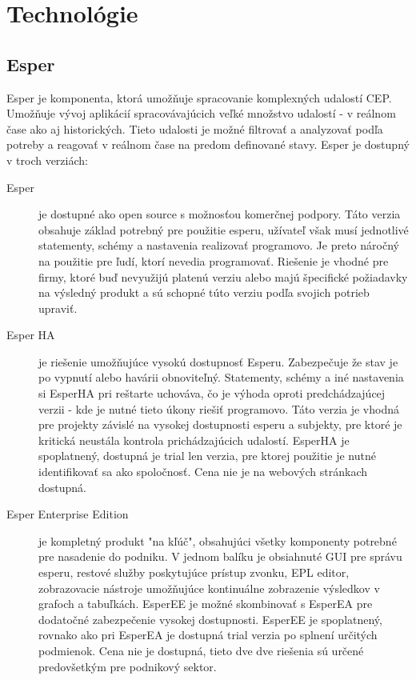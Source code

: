 \chapter{Technológie}
\label{chap:technologie}

\section{Esper}
	Esper je komponenta, ktorá umožňuje spracovanie komplexných udalostí \ac{CEP}. Umožňuje vývoj aplikácií spracovávajúcich veľké množstvo udalostí - v reálnom čase ako aj historických. Tieto udalosti je možné filtrovať a analyzovať podľa potreby a reagovať v reálnom čase na predom definované stavy.  Esper je dostupný v troch verziách:
	\begin{description}
		\item[Esper] je dostupné ako open source s možnosťou komerčnej podpory. Táto verzia obsahuje základ potrebný pre použitie esperu, užívateľ však musí jednotlivé statementy, schémy a nastavenia realizovať programovo. Je preto náročný na použitie pre ľudí, ktorí nevedia programovať. Riešenie je vhodné pre firmy, ktoré buď nevyužijú platenú verziu alebo majú špecifické požiadavky na výsledný produkt a sú schopné túto verziu podľa svojich potrieb upraviť.
		
		\item[Esper HA] je riešenie umožňujúce vysokú dostupnosť Esperu. Zabezpečuje že stav je po vypnutí alebo havárii obnoviteľný. Statementy, schémy a iné nastavenia si EsperHA pri reštarte uchováva, čo je výhoda oproti predchádzajúcej verzii - kde je nutné tieto úkony riešiť programovo. Táto verzia je vhodná pre projekty závislé na vysokej dostupnosti esperu a subjekty, pre ktoré je kritická neustála kontrola prichádzajúcich udalostí.
		EsperHA je spoplatnený, dostupná je trial len verzia, pre ktorej použitie je nutné identifikovať sa ako spoločnosť. Cena nie je na webových stránkach dostupná.
		
		\item[Esper Enterprise Edition] je kompletný produkt "na kľúč", obsahujúci všetky komponenty potrebné pre nasadenie do podniku. V jednom balíku je obsiahnuté GUI pre správu esperu, restové služby poskytujúce prístup zvonku, \ac{EPL} editor, zobrazovacie nástroje umožňujúce kontinuálne zobrazenie výsledkov v grafoch a tabuľkách. EsperEE je možné skombinovať s EsperEA pre dodatočné zabezpečenie vysokej dostupnosti. EsperEE je spoplatnený, rovnako ako pri EsperEA je dostupná trial verzia po splnení určitých podmienok. Cena nie je dostupná, tieto dve dve riešenia sú určené predovšetkým pre podnikový sektor.
	\end{description}
	

